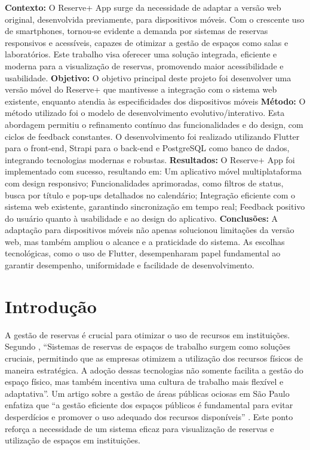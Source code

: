 \documentclass[12pt]{article}
\begin{document}
\begin{resumo} 
\textbf{Contexto:} O Reserve+ App surge da necessidade de adaptar a versão web original, desenvolvida previamente, para dispositivos móveis. Com o crescente uso de smartphones, tornou-se evidente a demanda por sistemas de reservas responsivos e acessíveis, capazes de otimizar a gestão de espaços como salas e laboratórios. Este trabalho visa oferecer uma solução integrada, eficiente e moderna para a visualização de reservas, promovendo maior acessibilidade e usabilidade. \textbf{Objetivo:} O objetivo principal deste projeto foi desenvolver uma versão móvel do Reserve+ que mantivesse a integração com o sistema web existente, enquanto atendia às especificidades dos dispositivos móveis \textbf{Método:} O método utilizado foi o modelo de desenvolvimento evolutivo/interativo. Esta abordagem permitiu o refinamento contínuo das funcionalidades e do design, com ciclos de feedback constantes. O desenvolvimento foi realizado utilizando Flutter para o front-end, Strapi para o back-end e PostgreSQL como banco de dados, integrando tecnologias modernas e robustas. \textbf{Resultados:} O Reserve+ App foi implementado com sucesso, resultando em: Um aplicativo móvel multiplataforma com design responsivo; Funcionalidades aprimoradas, como filtros de status, busca por título e pop-ups detalhados no calendário; Integração eficiente com o sistema web existente, garantindo sincronização em tempo real; Feedback positivo do usuário quanto à usabilidade e ao design do aplicativo. \textbf{Conclusões:} A adaptação para dispositivos móveis não apenas solucionou limitações da versão web, mas também ampliou o alcance e a praticidade do sistema. As escolhas tecnológicas, como o uso de Flutter, desempenharam papel fundamental ao garantir desempenho, uniformidade e facilidade de desenvolvimento. 
\end{resumo}


\section{Introdução} \label{sec:introduction}

A gestão de reservas é crucial para otimizar o uso de recursos em instituições. Segundo \cite{konia}, ``Sistemas de reservas de espaços de trabalho surgem como soluções cruciais, permitindo que as empresas otimizem a utilização dos recursos físicos de maneira estratégica. A adoção dessas tecnologias não somente facilita a gestão do espaço físico, mas também incentiva uma cultura de trabalho mais flexível e adaptativa''. Um artigo sobre a gestão de áreas públicas ociosas em São Paulo enfatiza que ``a gestão eficiente dos espaços públicos é fundamental para evitar desperdícios e promover o uso adequado dos recursos disponíveis'' \cite{silber}. Este ponto reforça a necessidade de um sistema eficaz para visualização de reservas e utilização de espaços em instituições.
\end{document}
